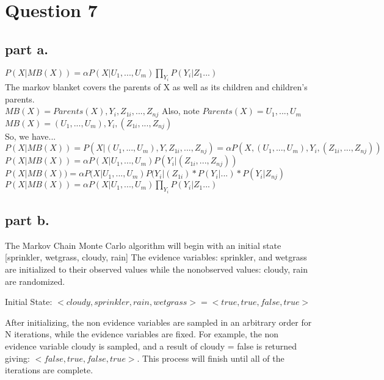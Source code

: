 \section{Question 7}

\subsection{part a.}

 $ P(X|MB(X)) = \alpha P(X|U_1,...,U_m)  \prod\limits_{Y_i}^{} P(Y_i|Z_1...) $ \\
\noindent
The markov blanket covers the parents of X as well as its children and children's parents. \\
$ MB(X) =  Parents(X), Y_i, Z_{1i},...,Z_{nj} $  Also, note $ Parents(X) = U_1,...,U_m $\\
\noindent
$ MB(X) = (U_1,...,U_m), Y_i, (Z_{1i},...,Z_{nj}) $ \\

\noindent
So, we have... \\
$ P(X|MB(X)) = P(X | (U_1,...,U_m), Y, Z_{1i},...,Z_{nj}) = \alpha P(X,(U_1,...,U_m), Y_i, (Z_{1i},...,Z_{nj})) $ \\
\noindent
$ P(X|MB(X)) = \alpha P(X | U_1,...,U_m) P(Y_i | (Z_{1i},...,Z_{nj})) $ \\
$ P(X|MB(X)) = \alpha P(X | U_1,...,U_m) P(Y_i | (Z_{1i}) * P(Y_i |...) * P(Y_i | Z_{nj})$ \\
$ P(X|MB(X)) = \alpha P(X|U_1,...,U_m)  \prod\limits_{Y_i}^{} P(Y_i|Z_1...) $ \\

\subsection{part b.}

  The Markov Chain Monte Carlo algorithm will begin with an initial state [sprinkler, wetgrass, cloudy, rain]
  The evidence variables: sprinkler, and wetgrass are initialized to their observed values while the nonobserved values: cloudy, rain are
  randomized. \\ \noindent

  Initial State: $<cloudy, sprinkler, rain, wetgrass> = <true, true, false, true>$ \\

  \noindent

  After initializing, the non evidence variables are sampled in an arbitrary order for N iterations, while the evidence variables are fixed.
  For example, the non evidence variable cloudy is sampled, and a result of cloudy = false is returned giving: $<false, true, false, true>$.
  This process will finish until all of the iterations are complete.

